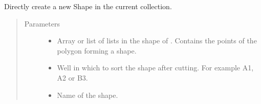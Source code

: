 \documentclass[a4paper,10pt,english,openany,oneside]{sphinxmanual}
\begin{document}
\begin{fulllineitems}
\begin{fulllineitems}
\label{\detokenize{pages/modules:lmd.lib.Collection.new_shape}}
\sphinxAtStartPar
Directly create a new Shape in the current collection.
\begin{quote}\begin{description}
\item[{Parameters}] \leavevmode\begin{itemize}
\item {} 
\sphinxAtStartPar
{} \textendash{} Array or list of lists in the shape of . Contains the points of the polygon forming a shape.

\item {} 
\sphinxAtStartPar
{} \textendash{} Well in which to sort the shape after cutting. For example A1, A2 or B3.

\item {} 
\sphinxAtStartPar
{} \textendash{} Name of the shape.

\end{itemize}

\end{description}\end{quote}

\end{fulllineitems}



\end{fulllineitems}
\end{document}
